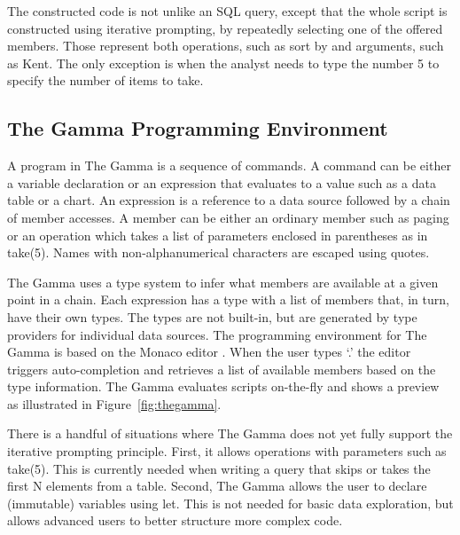 \documentclass[manuscript,review,anonymous]{acmart}
\newcommand{\ikvd}[1]{{\fontfamily{zi4}\selectfont\small #1}}
\begin{document}
\noindent
The constructed code is not unlike an SQL query, except that the whole script is constructed using
iterative prompting, by repeatedly selecting one of the offered members. Those represent both
operations, such as \ikvd{sort by} and arguments, such as \ikvd{Kent}. The only exception
is when the analyst needs to type the number \ikvd{5} to specify the number of items to take.

\subsection{The Gamma Programming Environment}
\label{sec:overview-lang}

A program in The Gamma is a sequence of commands. A command can be either a variable declaration
or an expression that evaluates to a value such as a data table or a chart.
An expression is a reference to a data source followed by a chain of member accesses.
A member can be either an ordinary member such as \ikvd{paging} or an operation which takes a
list of parameters enclosed in parentheses as in \ikvd{take(5)}.
Names with non-alphanumerical characters are escaped using quotes.

The Gamma uses a type system to infer what members are available at a given point in a chain.
Each expression has a type with a list of members that, in turn, have their own types.
The types are not built-in, but are generated by type providers for individual data sources.
The programming environment for The Gamma is based on the Monaco editor \cite{monaco}. When the user types `.'
the editor triggers auto-completion and retrieves a list of available members based on the type
information. The Gamma evaluates scripts on-the-fly and shows a preview as
illustrated in Figure~\ref{fig:thegamma}.

There is a handful of situations where The Gamma does not yet fully support the iterative prompting
principle. First, it allows operations with parameters such as \ikvd{take(5)}. This is currently
needed when writing a query that skips or takes the first N elements from a table. Second,
The Gamma allows the user to declare (immutable) variables using \ikvd{let}. This is not needed
for basic data exploration, but allows advanced users to better structure more complex code.
\end{document}
